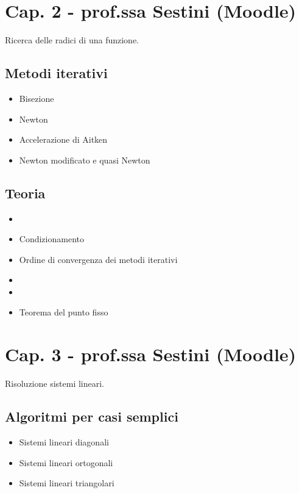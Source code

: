 \documentclass[a4paper, 12pt]{article}
\begin{document}
\newpage

\section{Cap. 2 - prof.ssa Sestini (Moodle)}

Ricerca delle radici di una funzione.

\subsection{Metodi iterativi}

	\begin{itemize}
		\item Bisezione
		\item Newton
		\item Accelerazione di Aitken
		\item Newton modificato e quasi Newton
	\end{itemize}

\subsection{Teoria}

	\begin{itemize}
		\item \color{blue}{Criteri di arresto} \color{black}
		\item Condizionamento
		\item Ordine di convergenza dei metodi iterativi
		\item \color{blue}{Convergenza locale} \color{black}
		\item \color{blue}{Caso di radici multiple} \color{black}
		\item Teorema del punto fisso
	\end{itemize}

\vspace{0.5cm}

\section{Cap. 3 - prof.ssa Sestini (Moodle)}

Risoluzione sistemi lineari.

\subsection{Algoritmi per casi semplici}

	\begin{itemize}
		\item Sistemi lineari diagonali
		\item Sistemi lineari ortogonali
		\item Sistemi lineari triangolari
	\end{itemize}
\end{document}
